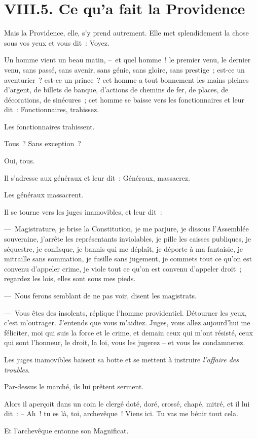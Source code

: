\documentclass[french,twoside]{book} %
\begin{document}
\section[{VIII.5. Ce qu’a fait la Providence}]{VIII.5. Ce qu’a fait la Providence}

\noindent Mais la Providence, elle, s’y prend autrement. Elle met splendidement la chose sous vos yeux et vous dit : Voyez.\par
Un homme vient un beau matin, – et quel homme ! le premier venu, le dernier venu, sans passé, sans avenir, sans génie, sans gloire, sans prestige ; est-ce un aventurier ? est-ce un prince ? cet homme a tout bonnement les mains pleines d’argent, de billets de banque, d’actions de chemins de fer, de places, de décorations, de sinécures ; cet homme se baisse vers les fonctionnaires et leur dit : Fonctionnaires, trahissez.\par
Les fonctionnaires trahissent.\par
Tous ? Sans exception ?\par
Oui, tous.\par
Il s’adresse aux généraux et leur dit : Généraux, massacrez.\par
Les généraux massacrent.\par
Il se tourne vers les juges inamovibles, et leur dit :\par
— Magistrature, je brise la Constitution, je me parjure, je dissous l’Assemblée souveraine, j’arrête les représentants inviolables, je pille les caisses publiques, je séquestre, je confisque, je bannis qui me déplaît, je déporte à ma fantaisie, je mitraille sans sommation, je fusille sans jugement, je commets tout ce qu’on est convenu d’appeler crime, je viole tout ce qu’on est convenu d’appeler droit ; regardez les lois, elles sont sous mes pieds.\par
— Nous ferons semblant de ne pas voir, disent les magistrats.\par
— Vous êtes des insolents, réplique l’homme providentiel. Détourner les yeux, c’est m’outrager. J’entends que vous m’aidiez. Juges, vous allez aujourd’hui me féliciter, moi qui suis la force et le crime, et demain ceux qui m’ont résisté, ceux qui sont l’honneur, le droit, la loi, vous les jugerez – et vous les condamnerez.\par
Les juges inamovibles baisent sa botte et se mettent à instruire \emph{l’affaire des troubles}.\par
Par-dessus le marché, ils lui prêtent serment.\par
Alors il aperçoit dans un coin le clergé doté, doré, crossé, chapé, mitré, et il lui dit : – Ah ! tu es là, toi, archevêque ! Viens ici. Tu vas me bénir tout cela.\par
Et l’archevêque entonne son Magnificat.
\end{document}
